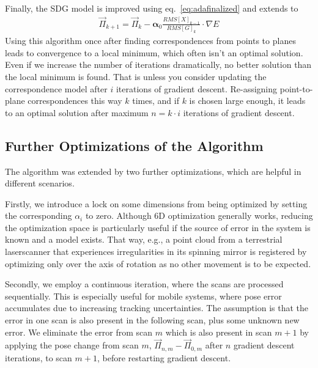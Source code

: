 Finally, the SDG model is improved using eq.~\eqref{eq:adafinalized} and extends to 
\begin{align}
    \vec{\Pi}_{k+1} = \vec{\Pi}_{k} - \boldsymbol\alpha_0  \frac{RMS[X]_{k-1}}{RMS[G]_{k}} \cdot \nabla E
\end{align}
Using this algorithm once after finding correspondences from points to planes leads to convergence to a local minimum, which often isn't an optimal solution.
Even if  we increase the number of iterations dramatically, no better solution than the local minimum is found.
That is unless you consider updating the correspondence model after $i$ iterations of gradient descent.
Re-assigning point-to-plane correspondences this way $k$ times, and if $k$ is chosen large enough, it leads to an optimal solution after maximum $n = k\cdot i$ iterations of gradient descent.

\subsection{Further Optimizations of the Algorithm}

The algorithm was extended by two further optimizations, which are helpful in different scenarios.

Firstly, we introduce a lock on some dimensions from being optimized by setting the corresponding $\alpha_i$ to zero.
Although 6D optimization generally works, reducing the optimization space is particularly useful if the source of error in the system is known and a model exists.
That way, e.g., a point cloud from a terrestrial laserscanner that experiences irregularities in its spinning mirror is registered by optimizing only over the axis of rotation as no other movement is to be expected.

Secondly, we employ a continuous iteration, where the scans are processed sequentially. 
This is especially useful for mobile systems, where pose error accumulates due to increasing tracking uncertainties.
The assumption is that the error in one scan is also present in the following scan, plus some unknown new error.
We eliminate the error from scan $m$ which is also present in scan $m+1$ by applying the pose change from scan $m$, $\vec{\Pi}_{n,m} - \vec{\Pi}_{0,m}$ after $n$ gradient descent iterations, to scan $m+1$, before restarting gradient descent.
